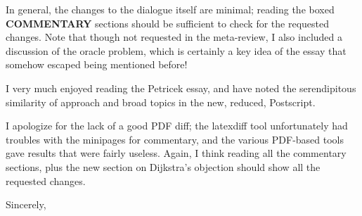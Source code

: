 \documentclass{letter}
\begin{document}
\begin{letter}{}
\begin{enumerate}
\end{enumerate}

In general, the changes to the dialogue itself are minimal; reading the boxed {\bf COMMENTARY} sections should be sufficient to check for the requested changes.  Note that though not requested in the meta-review, I also included a discussion of the oracle problem, which is certainly a key idea of the essay that somehow escaped being mentioned before!

I very much enjoyed reading the Petricek essay, and have noted the serendipitous similarity of approach and broad topics in the new, reduced, Postscript.

I apologize for the lack of a good PDF diff; the latexdiff tool unfortunately had troubles with the minipages for commentary, and the various PDF-based tools gave results that were fairly useless.  Again, I think reading all the commentary sections, plus the new section on Dijkstra's objection should show all the requested changes.

\closing{Sincerely,}



\end{letter}
\end{document}
